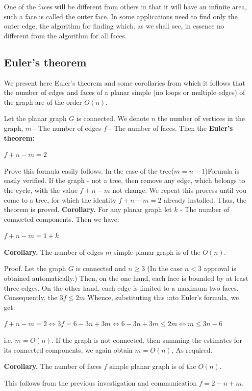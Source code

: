 One of the faces will be different from others in that it will have an infinite area, such a face is called the outer face. In some applications need to find only the outer edge, the algorithm for finding which, as we shall see, in essence no different from the algorithm for all faces.

\subsection{ Euler's theorem }

We present here Euler's theorem and some corollaries from which it follows that the number of edges and faces of a planar simple (no loops or multiple edges) of the graph are of the order $O (n)$.

Let the planar graph $G$ is connected. We denote $n$ the number of vertices in the graph, $m$ - The number of edges $f$ - The number of faces. Then the \textbf{Euler's theorem:}

$f + n - m = 2$

Prove this formula easily follows. In the case of the tree($m = n-1$)Formula is easily verified. If the graph - not a tree, then remove any edge, which belongs to the cycle, with the value $f + n-m$ not change. We repeat this process until you come to a tree, for which the identity $f + n-m = 2$ already installed. Thus, the theorem is proved.
\textbf{Corollary.} For any planar graph let $k$ - The number of connected components. Then we have:

$f + n - m = 1 + k$

\textbf{Corollary.} The number of edges $m$ simple planar graph is of the $O (n)$.

Proof. Let the graph $G$ is connected and $n \ge 3$ (In the case $n <3$ approval is obtained automatically.) Then, on the one hand, each face is bounded by at least three edges. On the other hand, each edge is limited to a maximum two faces. Consequently, the $3f \le 2m$ Whence, substituting this into Euler's formula, we get:

$f+n-m=2\Leftrightarrow3f=6-3n+3m\Leftrightarrow6-3n+3m\leq2m\Leftrightarrow m\leq3n-6$

i.e. $m = O (n)$.
If the graph is not connected, then summing the estimates for its connected components, we again obtain $m = O (n)$, As required.

\textbf{Corollary.} The number of faces $f$ simple planar graph is of the $O (n)$.

This follows from the previous investigation and communication $f = 2 - n + m$.


